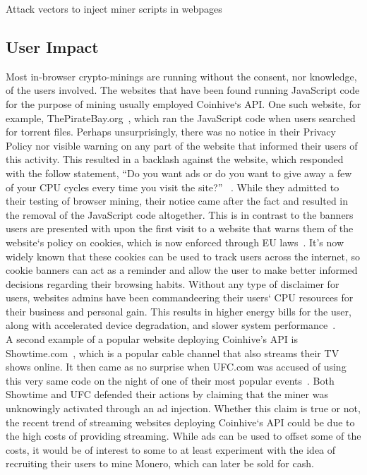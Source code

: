 \begin{center}
	\caption{Attack vectors to inject miner scripts in webpages}
\end{center}

\subsection{User Impact}

Most in-browser crypto-minings are running without the consent, nor knowledge, of the users involved. The websites that have been found running JavaScript code for the purpose of mining usually employed Coinhive`s API. One such website, for example, ThePirateBay.org~\cite{bbcmintcrypto}, which ran the JavaScript code when users searched for torrent files. Perhaps unsurprisingly, there was no notice in their Privacy Policy nor visible warning on any part of the website that informed their users of this activity. This resulted in a backlash against the website, which responded with the follow statement, ``Do you want ads or do you want to give away a few of your CPU cycles every time you visit the site?'' ~\cite{piratesbayblog}. While they admitted to their testing of browser mining, their notice came after the fact and resulted in the removal of the JavaScript code altogether. This is in contrast to the banners users are presented with upon the first visit to a website that warns them of the website`s policy on cookies, which is now enforced through EU laws~\cite{eucookie}. It’s now widely known that these cookies can be used to track users across the internet, so cookie banners can act as a reminder and allow the user to make better informed decisions regarding their browsing habits. Without any type of disclaimer for users, websites admins have been commandeering their users` CPU resources for their business and personal gain. This results in higher energy bills for the user, along with accelerated device degradation, and slower system performance~\cite{gaurdianelectricity}.
\\
A second example of a popular website deploying Coinhive’s API is Showtime.com~\cite{gaurdianelectricity}, which is a popular cable channel that also streams their TV shows online. It then came as no surprise when UFC.com was accused of using this very same code on the night of one of their most popular events~\cite{registerufcmonero}. Both Showtime and UFC defended their actions by claiming that the miner was unknowingly activated through an ad injection. Whether this claim is true or not, the recent trend of streaming websites deploying Coinhive`s API could be due to the high costs of providing streaming. While ads can be used to offset some of the costs, it would be of interest to some to at least experiment with the idea of recruiting their users to mine Monero, which can later be sold for cash.
